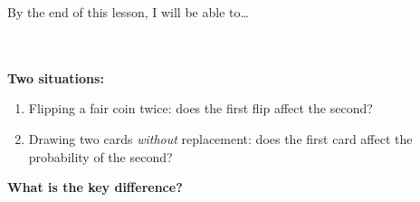 \documentclass[10pt]{article}
\begin{document}
\namedateperiod

\vspace{0.12in}

\begin{objectivebox}
\small By the end of this lesson, I will be able to\dots\\[4pt]
\writeline\\[1pt]
\writeline\\[1pt]
\writeline
\end{objectivebox}

\vspace{0.1in}

\begin{vocabbox}
\end{vocabbox}

\vspace{0.1in}

\begin{hookbox}
\small
\textbf{Two situations:}
\begin{enumerate}[leftmargin=1.5em, itemsep=4pt]
  \item Flipping a fair coin twice: does the first flip affect the second?
        \blank{3cm}
  \item Drawing two cards \emph{without} replacement: does the first card
        affect the probability of the second? \blank{3cm}
\end{enumerate}
\textbf{What is the key difference?}\\[4pt]
\writeline
\end{hookbox}

\vspace{0.1in}
\end{document}
